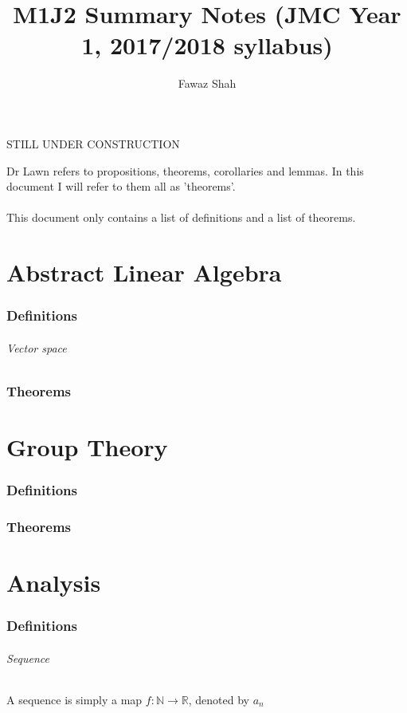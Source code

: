 \documentclass{article}
\title{M1J2 Summary Notes (JMC Year 1, 2017/2018 syllabus)}
\date{}
\author{Fawaz Shah}
\newcommand{\R}{\mathbb{R}}
\newcommand{\N}{\mathbb{N}}
\begin{document}
\large
\maketitle
\begin{center}
STILL UNDER CONSTRUCTION
\end{center}
\noindent Dr Lawn refers to propositions, theorems, corollaries and lemmas. In this document I will refer to them all as 'theorems'.
\\\\
\noindent This document only contains a list of definitions and a list of theorems.
\tableofcontents
\newpage
\part{Abstract Linear Algebra}

\section{Definitions}
\paragraph{Vector space}

\section{Theorems}

\newpage
\part{Group Theory}

\section{Definitions}

\section{Theorems}

\newpage
\part{Analysis}

\section{Definitions}
\paragraph{Sequence}
A sequence is simply a map $ f: \N \to \R $, denoted by $ a_{n} $
\end{document}
